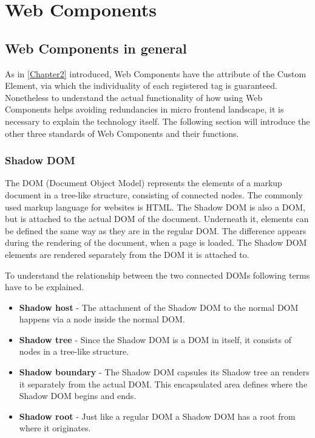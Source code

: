 \chapter{Web Components} %
\label{Chapter4}


\section{Web Components in general}

As in \ref{Chapter2} introduced, Web Components have the attribute of the Custom Element, via which the individuality of each registered tag is guaranteed.
Nonetheless to understand the actual functionality of how using Web Components helps avoiding redundancies in micro frontend landscape, it is necessary to explain the technology itself.
The following section will introduce the other three standards of Web Components and their functions.

\subsection{Shadow DOM}

The DOM (Document Object Model) represents the elements of a markup document in a tree-like structure, consisting of connected nodes. The commonly used markup language for websites is HTML. \cite{wc_shadow_dom}
The Shadow DOM is also a DOM, but is attached to the actual DOM of the document. Underneath it, elements can be defined the same way as they are in the regular DOM. The difference appears during the rendering of the document, when a page is loaded. The Shadow DOM elements are rendered separately from the DOM it is attached to.\cite{simon_thesis}

To understand the relationship between the two connected DOMs following terms have to be explained.

\begin{itemize}
	\item \textbf{Shadow host} - The attachment of the Shadow DOM to the normal DOM happens via a node inside the normal DOM.
	\item \textbf{Shadow tree} - Since the Shadow DOM is a DOM in itself, it consists of nodes in a tree-like structure.
	\item \textbf{Shadow boundary} - The Shadow DOM capsules its Shadow tree an renders it separately from the actual DOM. This encapsulated area defines where the Shadow DOM begins and ends.
	\item \textbf{Shadow root} - Just like a regular DOM a Shadow DOM has a root from where it originates.
\end{itemize} 

